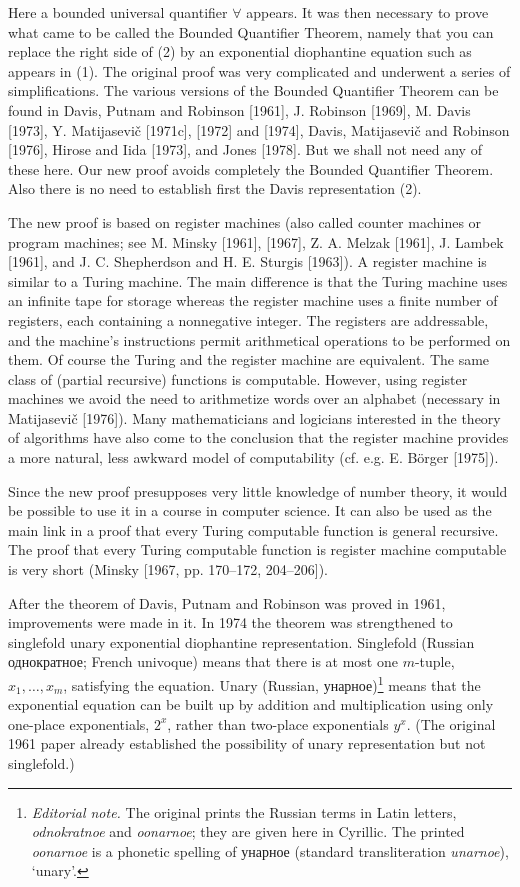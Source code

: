 \documentclass[11pt,leqno]{article}
\newcommand{\ednote}[1]{\footnote{\textit{Editorial note.} #1}}
\newcommand{\cyr}[1]{{\fontencoding{T2A}\fontfamily{Tempora-TLF}\selectfont #1}}
\begin{document}
Here a bounded universal quantifier $\forall$ appears. It was then necessary to prove what came to be called the Bounded Quantifier Theorem, namely that you can replace the right side of (2) by an exponential diophantine equation such as appears in (1). The original proof was very complicated and underwent a series of simplifications. The various versions of the Bounded Quantifier Theorem can be found in Davis, Putnam and Robinson [1961], J. Robinson [1969], M. Davis [1973], Y. Matijasevi\v{c} [1971c], [1972] and [1974], Davis, Matijasevi\v{c} and Robinson [1976], Hirose and Iida [1973], and Jones [1978]. But we shall not need any of these here. Our new proof avoids completely the Bounded Quantifier Theorem. Also there is no need to establish first the Davis representation (2).

The new proof is based on register machines (also called counter machines or program machines; see M. Minsky [1961], [1967], Z. A. Melzak [1961], J. Lambek [1961], and J. C. Shepherdson and H. E. Sturgis [1963]). A register machine is similar to a Turing machine. The main difference is that the Turing machine uses an infinite tape for storage whereas the register machine uses a finite number of registers, each containing a nonnegative integer. The registers are addressable, and the machine's instructions permit arithmetical operations to be performed on them. Of course the Turing and the register machine are equivalent. The same class of (partial recursive) functions is computable. However, using register machines we avoid the need to arithmetize words over an alphabet (necessary in Matijasevi\v{c} [1976]). Many mathematicians and logicians interested in the theory of algorithms have also come to the conclusion that the register machine provides a more natural, less awkward model of computability (cf. e.g. E. B\"{o}rger [1975]).

Since the new proof presupposes very little knowledge of number theory, it would be possible to use it in a course in computer science. It can also be used as the main link in a proof that every Turing computable function is general recursive. The proof that every Turing computable function is register machine computable is very short (Minsky [1967, pp. 170--172, 204--206]).

After the theorem of Davis, Putnam and Robinson was proved in 1961, improvements were made in it. In 1974 the theorem was strengthened to singlefold unary exponential diophantine representation. Singlefold (Russian \cyr{однократное}; French univoque) means that there is at most one $m$-tuple, $x_{1}, \ldots, x_{m}$, satisfying the equation. Unary (Russian, \cyr{унарное})\ednote{The original prints the Russian terms in Latin letters, \textit{odnokratnoe} and \textit{oonarnoe}; they are given here in Cyrillic. The printed \textit{oonarnoe} is a phonetic spelling of \cyr{унарное} (standard transliteration \textit{unarnoe}), `unary'.} means that the exponential equation can be built up by addition and multiplication using only one-place exponentials, $2^{x}$, rather than two-place exponentials $y^{x}$. (The original 1961 paper already established the possibility of unary representation but not singlefold.)
\end{document}
